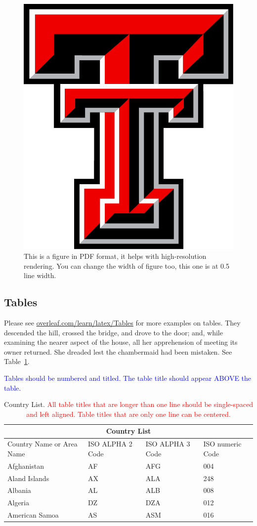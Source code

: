 \begin{figure}[!htb]
    \centering
    \includegraphics[width=0.5\linewidth]{chapters/figures/DoubleT.pdf}
    \caption{This is a figure in PDF format, it helps with high-resolution rendering. You can change the width of figure too, this one is at 0.5 line width.}
    \label{fig:DoubleT}    
\end{figure}

\subsection{Tables}

Please see \href{https://www.overleaf.com/learn/latex/Tables#Creating_a_simple_table_in_LaTeX}{overleaf.com/learn/latex/Tables} for more examples on tables. They descended the hill, crossed the bridge, and drove to the door; and, while examining the nearer aspect of the house, all her apprehension of meeting its owner returned. She dreaded lest the chambermaid had been mistaken. See Table~\ref{tab:my-table1}.

\textcolor{blue}{Tables should be numbered and titled. The table title should appear ABOVE the table.} 

\begin{table}[!htb]
    \caption{Country List. \textcolor{red}{All table titles that are longer than one line should be single-spaced and left aligned. Table titles that are only one line can be centered.}}
    \label{tab:my-table1}
\begin{tabular}{ |p{3cm}||p{3cm}|p{3cm}|p{3cm}|  }
 \hline
 \multicolumn{4}{|c|}{Country List} \\
 \hline
 Country Name or Area Name& ISO ALPHA 2 Code &ISO ALPHA 3 Code&ISO numeric Code\\
 \hline
 Afghanistan   & AF    &AFG&   004\\
 Aland Islands&   AX  & ALA   &248\\
 Albania &AL & ALB&  008\\
 Algeria    &DZ & DZA&  012\\
 American Samoa&   AS  & ASM&016\\
 \hline
\end{tabular}
\end{table}


